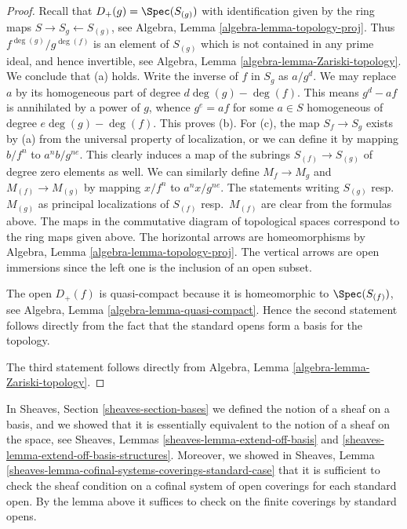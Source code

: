 \begin{proof}
Recall that $D_{+}(g) = \Spec(S_{(g)})$ with identification
given by the ring maps $S \to S_g \leftarrow S_{(g)}$, see
Algebra, Lemma \ref{algebra-lemma-topology-proj}.
Thus $f^{\deg(g)}/g^{\deg(f)}$ is an element of $S_{(g)}$ which is not
contained in any prime ideal, and hence invertible,
see Algebra, Lemma \ref{algebra-lemma-Zariski-topology}.
We conclude that (a) holds.
Write the inverse of $f$ in $S_g$ as $a/g^d$.
We may replace $a$ by its homogeneous part of degree $d\deg(g) - \deg(f)$.
This means $g^d - af$ is annihilated by a power of $g$, whence
$g^e = af$ for some $a \in S$ homogeneous of degree $e\deg(g) - \deg(f)$.
This proves (b).
For (c), the map $S_f \to S_g$ exists by (a) from the universal property
of localization, or we can define it by mapping $b/f^n$
to $a^nb/g^{ne}$. This clearly induces a map of the subrings
$S_{(f)} \to S_{(g)}$ of degree zero elements as well.
We can similarly define $M_f \to M_g$ and $M_{(f)} \to M_{(g)}$ by mapping
$x/f^n$ to $a^nx/g^{ne}$. The statements writing $S_{(g)}$
resp.\ $M_{(g)}$ as principal localizations of $S_{(f)}$ resp.\ $M_{(f)}$
are clear from the formulas above. The maps in the commutative diagram
of topological spaces correspond to the ring maps given above. The
horizontal arrows are homeomorphisms by
Algebra, Lemma \ref{algebra-lemma-topology-proj}.
The vertical arrows are open immersions since the left
one is the inclusion of an open subset.

\medskip\noindent
The open $D_{+}(f)$ is quasi-compact because it is homeomorphic
to $\Spec(S_{(f)})$, see  Algebra, Lemma \ref{algebra-lemma-quasi-compact}.
Hence the second statement follows directly
from the fact that the standard opens form
a basis for the topology.

\medskip\noindent
The third statement follows directly from
Algebra, Lemma \ref{algebra-lemma-Zariski-topology}.
\end{proof}

\noindent
In Sheaves, Section \ref{sheaves-section-bases} we defined
the notion of a sheaf on a basis, and we showed that it is
essentially equivalent to the notion of a sheaf on the space,
see Sheaves, Lemmas \ref{sheaves-lemma-extend-off-basis} and
\ref{sheaves-lemma-extend-off-basis-structures}. Moreover,
we showed in
Sheaves, Lemma \ref{sheaves-lemma-cofinal-systems-coverings-standard-case}
that it is sufficient to check the sheaf
condition on a cofinal system of open coverings for each
standard open. By the lemma above it suffices to check
on the finite coverings by standard opens.

